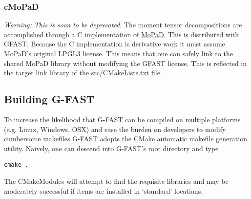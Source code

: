 \documentclass[12pt]{article}
\begin{document}
\subsubsection{cMoPaD}
\emph{Warning: This is soon to be deprecated}.
The moment tensor decompositions are accomplished through a C implementation of 
\href{https://github.com/geophysics/MoPaD}{MoPaD}.  This is distributed with GFAST.  
Because the C implementation is derivative work it must assume MoPaD's original 
LPGL3 license.  This means that one can safely link to the shared MoPaD library without
modifying the GFAST license.  This is reflected in the target link library of the 
src/CMakeLists.txt  file.

\subsection{Building G-FAST}

To increase the likelihood that G-FAST can be compiled on multiple platforms (e.g. Linux, 
Windows, OSX) and ease the burden on developers to modify cumbersome makefiles G-FAST 
adopts the \href{https://cmake.org/}{CMake} automatic makefile generation utility.  
Naively, one can descend into G-FAST's root directory and type 
\begin{verbatim}
cmake .
\end{verbatim}  
The CMakeModules will attempt to find the requisite libraries and may be moderately successful
if items are installed in `standard' locations.  
\end{document}

